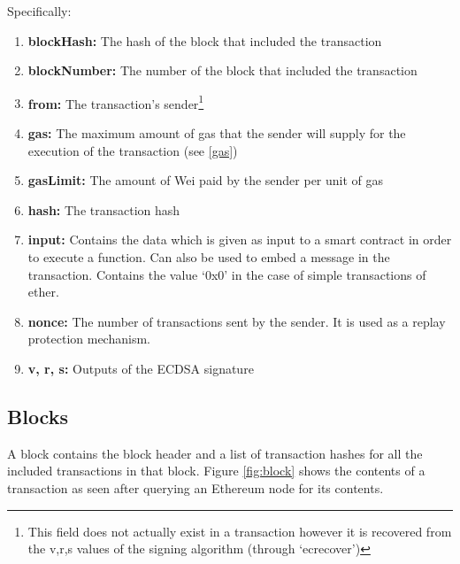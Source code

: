 Specifically:
\begin{enumerate}
    \item \textbf{blockHash:} The hash of the block that included the transaction
    \item \textbf{blockNumber:} The number of the block that included the transaction
    \item \textbf{from:} The transaction's sender\footnote{This field does not actually exist in a transaction however it is recovered from the v,r,s values of the signing algorithm (through `ecrecover')}
    \item \textbf{gas:} The maximum amount of gas that the sender will supply for the execution of the transaction (see \ref{gas})
    \item \textbf{gasLimit:} The amount of Wei paid by the sender per unit of gas
    \item \textbf{hash:} The transaction hash
    \item \textbf{input:} Contains the data which is given as input to a smart contract in order to execute a function. Can also be used to embed a message in the transaction. Contains the value `0x0' in the case of simple transactions of ether.
    \item \textbf{nonce:} The number of transactions sent by the sender. It is used as a replay protection mechanism.
    \item \textbf{v, r, s:} Outputs of the ECDSA signature
\end{enumerate}

\subsection{Blocks} \label{block}
A block contains the block header and a list of transaction hashes for all the included transactions in that block. Figure \ref{fig:block} shows the contents of a transaction as seen after querying an Ethereum node for its contents.

